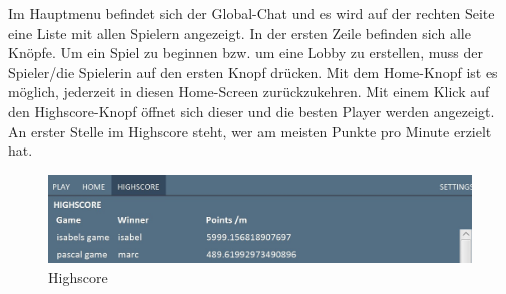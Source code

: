 \documentclass{scrartcl}
\begin{document}
Im Hauptmenu befindet sich der Global-Chat und es wird auf der rechten Seite eine Liste mit allen Spielern angezeigt. In der ersten Zeile befinden sich alle Knöpfe. Um ein Spiel zu beginnen bzw. um eine Lobby zu erstellen, muss der Spieler/die Spielerin auf den ersten Knopf drücken. Mit dem Home-Knopf ist es möglich, jederzeit in diesen Home-Screen zurückzukehren.
Mit einem Klick auf den Highscore-Knopf öffnet sich dieser und die besten Player werden angezeigt. An erster Stelle im Highscore steht, wer am meisten Punkte pro Minute erzielt hat.


\begin{figure}[H]
	\includegraphics[width=\linewidth]{highscore.JPG}
	\caption{Highscore}
	\label{fig:Highscore}
\end{figure}


\pagebreak
\end{document}
